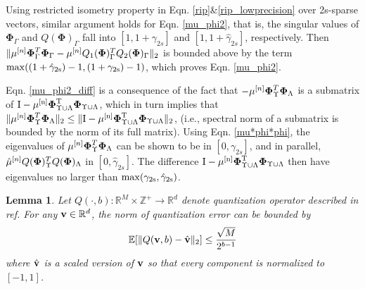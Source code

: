 \documentclass[article]{imsart}
\newtheorem{lemma}{Lemma}
\begin{document}
Using restricted isometry property in Eqn. \ref{rip}\&\ref{rip_lowprecision} over 2s-sparse vectors, similar argument holds for Eqn. \ref{mu_phi2}, that is, the singular values of $\boldsymbol{\Phi}_{\Gamma}$ and $Q(\boldsymbol{\Phi})_{\Gamma}$ fall into $[1, 1+ \gamma_{2s}]$ and $[1, 1+ \hat{\gamma}_{2s}]$, respectively. Then $\|\mu^{[n]}\boldsymbol{\Phi}_{\Gamma}^T\boldsymbol{{\bf \Phi}}_{\Gamma} - \mu^{[n]}Q_1(\boldsymbol{\Phi})_{\Gamma}^TQ_2(\boldsymbol{\Phi})_{\Gamma}\|_2$ is bounded above by the term $\rm{max}((1+\hat{\gamma}_{2s})-1, (1+\gamma_{2s})-1)$, which proves Eqn. \ref{mu_phi2}. 

Eqn. \ref{mu_phi2_diff} is a consequence of the fact that $-\mu^{[n]}\boldsymbol{{\bf \Phi}}_{\Upsilon}^T\boldsymbol{{\bf \Phi}}_{\Lambda}$ is a submatrix of $\rm{I}-\mu^{[n]}\boldsymbol{{\bf \Phi}}_{\Upsilon \cup \Lambda}^T\boldsymbol{{\bf \Phi}}_{\Upsilon \cup \Lambda}$, which in turn implies that $\|\mu^{[n]}\boldsymbol{{\bf \Phi}}_{\Upsilon}^T\boldsymbol{{\bf \Phi}}_{\Lambda}\|_2 \leq \|\rm{I}-\mu^{[n]}\boldsymbol{{\bf \Phi}}_{\Upsilon \cup \Lambda}^T\boldsymbol{{\bf \Phi}}_{\Upsilon \cup \Lambda} \|_2$, (i.e., spectral norm of a submatrix is bounded by the norm of its full matrix). Using Eqn. \ref{mu*phi*phi}, the eigenvalues of $\mu^{[n]}\boldsymbol{{\bf \Phi}}_{\Upsilon}^T\boldsymbol{{\bf \Phi}}_{\Lambda}$ can be shown to be in $[0, \gamma_{2s}]$, and in parallel, $\hat{\mu}^{[n]}Q(\boldsymbol{{\bf \Phi}})_{\Upsilon}^TQ(\boldsymbol{{\bf \Phi}})_{\Lambda}$ in $[0, \hat{\gamma}_{2s}]$. The difference $\rm{I}-\mu^{[n]}\boldsymbol{{\bf \Phi}}_{\Upsilon \cup \Lambda}^T\boldsymbol{{\bf \Phi}}_{\Upsilon \cup \Lambda}$ then have eigenvalues no larger than $\rm{max}(\gamma_{2s}, \hat{\gamma}_{2s})$.
\begin{lemma}\label{lemma_on_quantized_vector}
Let $Q(\cdot, b): \mathbb{R}^M\times \mathbb{Z}^+ \rightarrow \mathbb{R}^d$ denote quantization operator described in ref. For any ${\bf v}\in \mathbb{R}^d$, the norm of quantization error can be bounded by
\begin{equation}\label{quantization_error}
    \mathbb{E}[\| Q({\bf v}, b) - \hat{\bf v}\|_2] \leq \frac{\sqrt{M}}{2^{b-1}}
\end{equation}
where $\hat{\bf v}$ is a scaled version of ${\bf v}$ so that every component is normalized to $[-1, 1]$.
\end{lemma}
\end{document}
